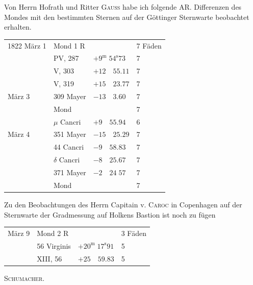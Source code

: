 Von Herrn Hofrath und Ritter \textsc{Gauss} habe ich folgende AR. Differenzen des Mondes mit den bestimmten Sternen auf der Göttinger Sternwarte beobachtet erhalten.

\begin{center}
\begin{tabular}{l|l|l|l}
1822 März 1 & Mond 1 R & & 7 Fäden \\
 & PV, 287 & $+9^{\mathrm{m}}\;54^{\mathrm{s}}73$ & 7 \\
 & V, 303 & $+12\quad55.11$ & 7 \\
 & V, 319 & $+15\quad23.77$ & 7 \\
März 3 & 309 Mayer & $-13\quad3.60$ & 7 \\
 & Mond & & 7 \\
 & $\mu$ Cancri & $+9\quad55.94$ & 6 \\
März 4 & 351 Mayer & $-15\quad25.29$ & 7 \\
 & 44 Cancri & $-9\quad58.83$ & 7 \\
 & $\delta$ Cancri & $-8\quad25.67$ & 7 \\
 & 371 Mayer & $-2\quad24\;57$ & 7 \\
 & Mond & & 7 \\
\end{tabular}
\end{center}

Zu den Beobachtungen des Herrn Capitain v. \textsc{Caroc} in Copenhagen auf der Sternwarte der Gradmessung auf Holkens Bastion ist noch zu fügen

\begin{center}
\begin{tabular}{l|l|l|l}
März 9 & Mond 2 R & & 3 Fäden \\
 & 56 Virginis & $+20^{\mathrm{m}}\;17^{\mathrm{s}}91$ & 5 \\
 & XIII, 56 & $+25\quad59.83$ & 5 \\
\end{tabular}
\end{center}

\begin{flushright}
\textsc{Schumacher}.
\end{flushright}
